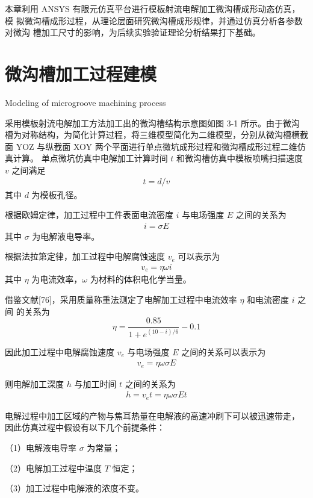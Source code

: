 \documentclass[
  type=doctor
]{../gdutthesis}
\begin{document}
本章利用 ANSYS 有限元仿真平台进行模板射流电解加工微沟槽成形动态仿真，模
拟微沟槽成形过程，从理论层面研究微沟槽成形规律，并通过仿真分析各参数对微沟
槽加工尺寸的影响，为后续实验验证理论分析结果打下基础。

\section{微沟槽加工过程建模}{Modeling of microgroove machining process}

采用模板射流电解加工方法加工出的微沟槽结构示意图如图 3-1 所示。由于微沟
槽为对称结构，为简化计算过程，将三维模型简化为二维模型，分别从微沟槽横截面
YOZ 与纵截面 XOY 两个平面进行单点微坑成形过程和微沟槽成形过程二维仿真计算。
单点微坑仿真中电解加工计算时间 $t$ 和微沟槽仿真中模板喷嘴扫描速度 $v$ 之间满足
\begin{align}
  t = d/v
\end{align}
其中 $d$ 为模板孔径。

根据欧姆定律，加工过程中工件表面电流密度 $i$ 与电场强度 $E$ 之间的关系为
\begin{align}
  i = \sigma E
\end{align}
其中 $σ$ 为电解液电导率。

根据法拉第定律，加工过程中电解腐蚀速度 $v_e$ 可以表示为
\begin{align}
  𝑣_e = 𝜂𝜔𝑖
\end{align}
其中 $η$ 为电流效率，$ω$ 为材料的体积电化学当量。

借鉴文献[76]，采用质量称重法测定了电解加工过程中电流效率 $𝜂$ 和电流密度 $𝑖$ 之间
的关系为
\begin{equation}
  \eta = \frac{0.85}{1 + e^{(10-i)/6}} - 0.1
\end{equation}

因此加工过程中电解腐蚀速度 $v_e$ 与电场强度 $E$ 之间的关系可以表示为
\begin{align}
  𝑣_e = 𝜂𝜔𝜎𝐸
\end{align}

则电解加工深度 $h$ 与加工时间 $t$ 之间的关系为
\begin{align}
  ℎ = 𝑣_e 𝑡 = 𝜂𝜔𝜎𝐸𝑡
\end{align}

电解过程中加工区域的产物与焦耳热量在电解液的高速冲刷下可以被迅速带走，
因此仿真过程中假设有以下几个前提条件：

（1）电解液电导率 $σ$ 为常量；

（2）电解加工过程中温度 $T$ 恒定；

（3）加工过程中电解液的浓度不变。
\end{document}
